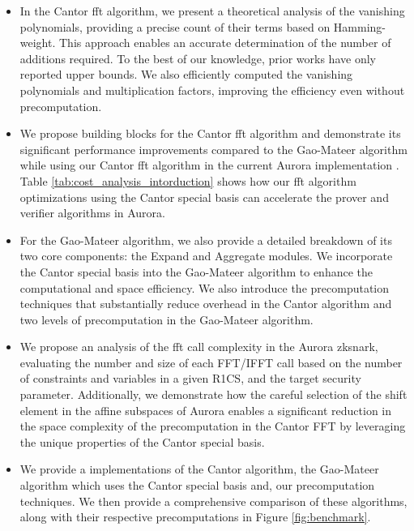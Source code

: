 \begin{itemize}
	\item In the Cantor \gls{fft} algorithm, we present a theoretical analysis of the vanishing polynomials, providing a precise count of their terms based on Hamming-weight. This approach enables an accurate determination of the number of additions required. To the best of our knowledge, prior works have only reported upper bounds. We also efficiently computed the vanishing polynomials and multiplication factors, improving the efficiency even without precomputation.
	
	\item We propose building blocks for the Cantor \gls{fft} algorithm and demonstrate its significant performance improvements compared to the Gao-Mateer algorithm while using our Cantor \gls{fft}  algorithm in the current Aurora implementation \cite{libiop}. Table \ref{tab:cost_analysis_intorduction} shows how our \gls{fft}  algorithm optimizations using the Cantor special basis can accelerate the prover and verifier algorithms in Aurora.
	
	\item  For the Gao-Mateer algorithm, we also provide a detailed breakdown of its two core components: the \textsf{Expand} and \textsf{Aggregate} modules. We incorporate the Cantor special basis into the Gao-Mateer algorithm to enhance the computational and space efficiency.
	We also introduce the precomputation techniques that substantially reduce overhead in the Cantor algorithm and two levels of precomputation in the Gao-Mateer algorithm.
	
	\item We propose an analysis of the \gls{fft} call complexity in the Aurora \gls{zksnark}, evaluating the number and size of each FFT/IFFT call based on the number of constraints and variables in a given R1CS, and the target security parameter. Additionally, we demonstrate how the careful selection of the shift element in the affine subspaces of Aurora enables a significant reduction in the space complexity of the precomputation in the Cantor FFT by leveraging the unique properties of the Cantor special basis.
	
	\item We provide a \CC  implementations of the Cantor algorithm, the Gao-Mateer algorithm which uses the Cantor special basis and, our precomputation techniques. We then provide a comprehensive comparison of these algorithms, along with their respective precomputations in Figure \ref{fig:benchmark}. 
	
	
\end{itemize}
